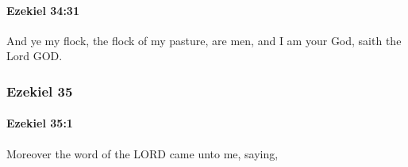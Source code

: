 		\paragraph{Ezekiel 34:31} %
			\label{EZEKIEL-34-31}

			And ye my flock, the flock of my pasture, are men, and I am your God, saith the Lord GOD.

	\subsubsection{Ezekiel 35} %
		\label{EZEKIEL-35}

		\paragraph{Ezekiel 35:1} %
			\label{EZEKIEL-35-1}

			Moreover the word of the LORD came unto me, saying,

